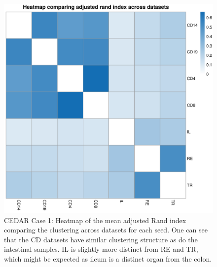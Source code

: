 \documentclass[12pt]{article} %
\begin{document}
	\begin{figure}[h]
		\centering
		\includegraphics[scale=0.75]{Images/Biology_data/Set_250/All_datasets/Arandi_heatmap.png}
		\caption{CEDAR Case 1: Heatmap of the mean adjusted Rand index comparing the clustering across datasets for each seed. One can see that the CD datasets have similar clustering structure as do the intestinal samples. IL is slightly more distinct from RE and TR, which might be expected as ileum is a distinct organ from the colon.}
		\label{fig:results:cedar_1:mdi_adj_rand_ind_heatmap}
	\end{figure}
	
	\newpage
	
\end{document}
